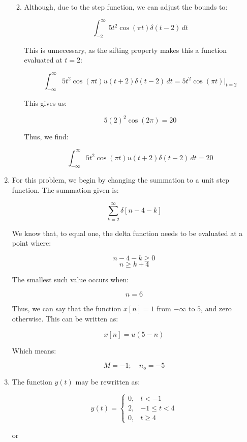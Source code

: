 \begin{enumerate}
\begin{enumerate}[label=\textbf{\Roman*.}]
\begin{enumerate}[label=\alph*)]
        \end{enumerate}

      \item 

        Although, due to the step function, we can adjust the bounds to:

        $$\int_{-2}^{\infty}5t^2\cos(\pi t)\delta(t-2)\,dt$$

        This is unnecessary, as the sifting property makes this a function evaluated at $t=2$:

        $$\int_{-\infty}^{\infty}5t^2\cos(\pi t)u(t+2)\delta(t-2)\,dt=5t^2\cos(\pi t)\Big|_{t=2}$$

        This gives us:

        $$5(2)^2\cos(2\pi)=20$$

        Thus, we find:

        $$\boxed{\int_{-\infty}^{\infty}5t^2\cos(\pi t)u(t+2)\delta(t-2)\,dt=20}$$

    \end{enumerate}

  \item

    For this problem, we begin by changing the summation to a unit step function. The summation given is:

    $$\sum_{k=2}^{\infty}\delta[n-4-k]$$

    We know that, to equal one, the delta function needs to be evaluated at a point where:

    $$n-4-k\geq 0$$
    $$n\geq k+4$$

    The smallest such value occurs when:

    $$n=6$$

    Thus, we can say that the function $x[n]=1$ from $-\infty$ to $5$, and zero otherwise. This can be written as:

    $$x[n]=u(5-n)$$

    Which means:

    $$\boxed{M=-1;\quad n_o=-5}$$

  \item

    The function $y(t)$ may be rewritten as:

    $$y(t)=\left\{\begin{matrix} 0, & t<-1\\ 2, & -1\leq t< 4\\ 0, & t\geq 4\end{matrix}$$

      \begin{center}
        or
      \end{center}


\end{enumerate}
